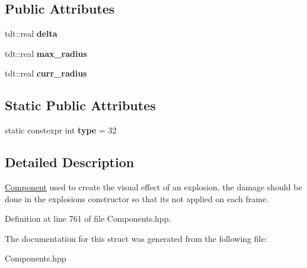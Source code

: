 \subsection*{Public Attributes}
\begin{DoxyCompactItemize}
\item 
tdt\+::real {\bfseries delta}\hypertarget{struct_explosion_component_a528fb7dd7384ec53530fcc3911cc4108}{}\label{struct_explosion_component_a528fb7dd7384ec53530fcc3911cc4108}

\item 
tdt\+::real {\bfseries max\+\_\+radius}\hypertarget{struct_explosion_component_a036937d4523e0ca25434048c3f248ffb}{}\label{struct_explosion_component_a036937d4523e0ca25434048c3f248ffb}

\item 
tdt\+::real {\bfseries curr\+\_\+radius}\hypertarget{struct_explosion_component_aee72886e30f94bbe495708aba9050c51}{}\label{struct_explosion_component_aee72886e30f94bbe495708aba9050c51}

\end{DoxyCompactItemize}
\subsection*{Static Public Attributes}
\begin{DoxyCompactItemize}
\item 
static constexpr int {\bfseries type} = 32\hypertarget{struct_explosion_component_afd2057c1401a1c850f4ee6de18b2f043}{}\label{struct_explosion_component_afd2057c1401a1c850f4ee6de18b2f043}

\end{DoxyCompactItemize}


\subsection{Detailed Description}
\hyperlink{struct_component}{Component} used to create the visual effect of an explosion, the damage should be done in the explosion\textquotesingle{}s constructor so that it\textquotesingle{}s not applied on each frame. 

Definition at line 761 of file Components.\+hpp.



The documentation for this struct was generated from the following file\+:\begin{DoxyCompactItemize}
\item 
Components.\+hpp\end{DoxyCompactItemize}
